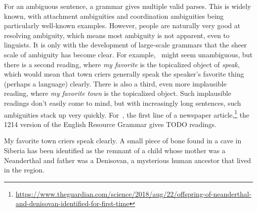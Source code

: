 \documentclass[output=paper]{langsci/langscibook}
\begin{document}
For an ambiguous sentence,
a grammar gives multiple valid parses.
This is widely known, with attachment ambiguities and coordination ambiguities
being particularly well-known examples.
However, people are naturally very good at resolving ambiguity,
which means most ambiguity is not apparent, even to linguists.
It is only with the development of large-scale grammars that the sheer scale of ambiguity has become clear.
For example, ~might seem unambiguous,
but there is a second reading, where \textit{my favorite} is the topicalized object of \textit{speak},
which would mean that town criers generally speak the speaker's favorite thing (perhaps a language) clearly.
There is also a third, even more implausible reading, where \textit{my favorite town} is the topicalized object.
Such implausible readings don't easily come to mind,
but with increasingly long sentences, such ambiguities stack up very quickly.
For~, the first line of a newspaper article,\footnote{%
	\url{https://www.theguardian.com/science/2018/aug/22/offspring-of-neanderthal-and-denisovan-identified-for-first-time}
}
the 1214 version of the English Resource Grammar \citep{Flickinger2000a,Flickinger2011a-u}
gives TODO readings.


\begin{exe}
\ex\label{cl:ex:ambig-simple}
My favorite town criers speak clearly.
\ex\label{cl:ex:ambig-many}
A small piece of bone found in a cave in Siberia has been identified
as the remnant of a child whose mother was a Neanderthal and father was a Denisovan,
a mysterious human ancestor that lived in the region.
\end{exe}
\end{document}
